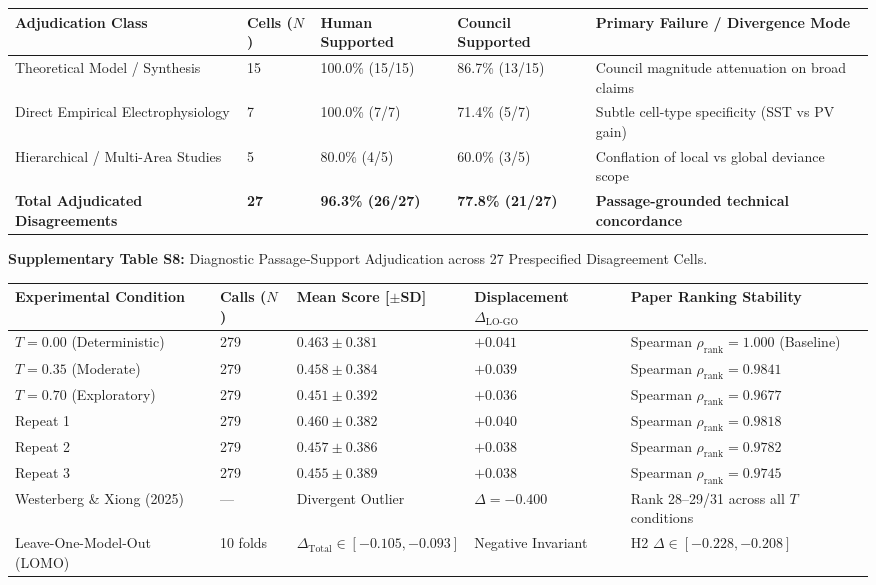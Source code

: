 \documentclass[12pt]{article}
\begin{document}
\begin{longtable}[]{@{}lllll@{}}
\toprule
\textbf{Adjudication Class} & \textbf{Cells ($N$)} & \textbf{Human Supported} & \textbf{Council Supported} & \textbf{Primary Failure / Divergence Mode} \\
\midrule
\endhead
\bottomrule
\endlastfoot
Theoretical Model / Synthesis & 15 & 100.0\% (15/15) & 86.7\% (13/15) & Council magnitude attenuation on broad claims \\
Direct Empirical Electrophysiology & 7 & 100.0\% (7/7) & 71.4\% (5/7) & Subtle cell-type specificity (SST vs PV gain) \\
Hierarchical / Multi-Area Studies & 5 & 80.0\% (4/5) & 60.0\% (3/5) & Conflation of local vs global deviance scope \\
\midrule
\textbf{Total Adjudicated Disagreements} & \textbf{27} & \textbf{96.3\% (26/27)} & \textbf{77.8\% (21/27)} & \textbf{Passage-grounded technical concordance} \\
\end{longtable}

\textbf{Supplementary Table S8:} Diagnostic Passage-Support Adjudication across 27 Prespecified Disagreement Cells.

\begin{longtable}[]{@{}lllll@{}}
\toprule
\textbf{Experimental Condition} & \textbf{Calls ($N$)} & \textbf{Mean Score [$\pm$SD]} & \textbf{Displacement $\Delta_{\text{LO-GO}}$} & \textbf{Paper Ranking Stability} \\
\midrule
\endhead
\bottomrule
\endlastfoot
$T = 0.00$ (Deterministic) & 279 & $0.463 \pm 0.381$ & $+0.041$ & Spearman $\rho_{\text{rank}} = 1.000$ (Baseline) \\
$T = 0.35$ (Moderate) & 279 & $0.458 \pm 0.384$ & $+0.039$ & Spearman $\rho_{\text{rank}} = 0.9841$ \\
$T = 0.70$ (Exploratory) & 279 & $0.451 \pm 0.392$ & $+0.036$ & Spearman $\rho_{\text{rank}} = 0.9677$ \\
\midrule
Repeat 1 & 279 & $0.460 \pm 0.382$ & $+0.040$ & Spearman $\rho_{\text{rank}} = 0.9818$ \\
Repeat 2 & 279 & $0.457 \pm 0.386$ & $+0.038$ & Spearman $\rho_{\text{rank}} = 0.9782$ \\
Repeat 3 & 279 & $0.455 \pm 0.389$ & $+0.038$ & Spearman $\rho_{\text{rank}} = 0.9745$ \\
\midrule
Westerberg \& Xiong (2025) & --- & Divergent Outlier & $\Delta = -0.400$ & Rank 28--29/31 across all $T$ conditions \\
Leave-One-Model-Out (LOMO) & 10 folds & $\Delta_{\text{Total}} \in [-0.105, -0.093]$ & Negative Invariant & H2 $\Delta \in [-0.228, -0.208]$ \\
\end{longtable}
\end{document}
